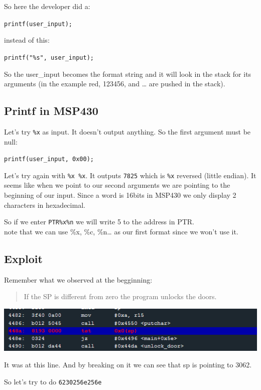 \documentclass[a4paper,11pt]{article}
\begin{document}
So here the developer did a:

\texttt{printf(user\_input);}

instead of this:

\texttt{printf("\%s", user\_input);}

So the user\_input becomes the format string and it will look in the
stack for its arguments (in the example red, 123456, and \ldots{} are
pushed in the stack).

\subsection{Printf in MSP430}\label{printf-in-msp430}

Let's try \texttt{\%x} as input. It doesn't output anything. So the
first argument must be null:

\texttt{printf(user\_input, 0x00);}

Let's try again with \texttt{\%x \%x}. It outputs \texttt{7825} which is
\texttt{\%x} reversed (little endian). It seems like when we point to
our second arguments we are pointing to the beginning of our input.
Since a word is 16bits in MSP430 we only display 2 characters in
hexadecimal.

So if we enter \texttt{PTR\%x\%n} we will write 5 to the address in
PTR.\\note that we can use \%x, \%c, \%n\ldots{} as our first format
since we won't use it.

\subsection{Exploit}\label{exploit}

Remember what we observed at the begginning:

\begin{quote}
If the SP is different from zero the program unlocks the doors.
\end{quote}

\includegraphics{img/12_5.PNG}

It was at this line. And by breaking on it we can see that sp is
pointing to 3062.

So let's try to do \texttt{6230256e256e}
\end{document}
